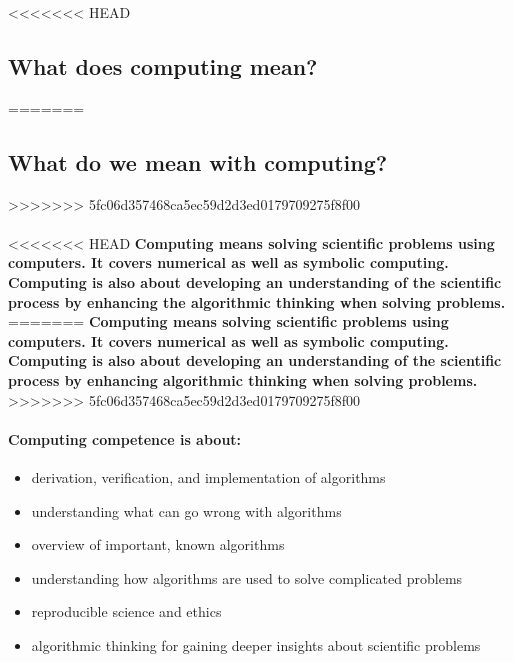 \documentclass[%
<<<<<<< HEAD
oneside,                 %
final,                   %
=======
twoside,                 %
final,                   %
>>>>>>> 5fc06d357468ca5ec59d2d3ed0179709275f8f00
10pt]{article}
\begin{document}
\noindent





<<<<<<< HEAD
\subsection*{What does computing mean?}

=======
\subsection*{What do we mean with computing?}
>>>>>>> 5fc06d357468ca5ec59d2d3ed0179709275f8f00

\paragraph{}

<<<<<<< HEAD
\textbf{Computing means solving scientific problems using computers. It covers numerical as well as symbolic computing. Computing is also about developing an understanding of the scientific process by enhancing the algorithmic thinking when solving problems.}
=======
\textbf{Computing means solving scientific problems using computers. It covers numerical as well as symbolic computing. Computing is also about developing an understanding of the scientific process by enhancing algorithmic thinking when solving problems.}
>>>>>>> 5fc06d357468ca5ec59d2d3ed0179709275f8f00





\paragraph{Computing competence is about:}

\begin{itemize}
\item derivation, verification, and implementation of algorithms

\item understanding what can go wrong with algorithms

\item overview of important, known algorithms

\item understanding how algorithms are used to solve complicated problems

\item reproducible science and ethics

\item algorithmic thinking for gaining deeper insights about scientific problems
\end{itemize}
\end{document}
